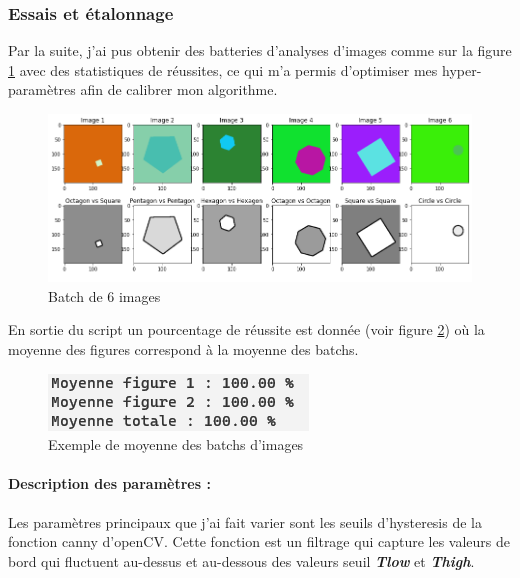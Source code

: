 	
	\subsubsection{Essais et étalonnage}
	Par la suite, j'ai pus obtenir des batteries d'analyses d'images comme sur la figure \ref{fig:batchexemple} avec des statistiques de réussites, ce qui m'a permis d'optimiser mes hyper-paramètres afin de calibrer mon algorithme.
	\begin{figure}[h]
		\centering
		\includegraphics[width=\textwidth]{Figures/BatchExemple}
		\caption{Batch de 6 images}
		\label{fig:batchexemple}
	\end{figure}
	
	En sortie du script un pourcentage de réussite est donnée (voir figure \ref{fig:moyennebatchs}) où la moyenne des figures correspond à la moyenne des batchs.
	
	\begin{figure}[h]
		\centering
		\includegraphics[width=0.5\linewidth]{Figures/MoyenneBatchs}
		\caption{Exemple de moyenne des batchs d'images}
		\label{fig:moyennebatchs}
	\end{figure}
	
	
	\paragraph{Description des paramètres : } Les paramètres principaux que j'ai fait varier sont les seuils d'hysteresis de la fonction canny d'openCV. Cette fonction est un filtrage qui capture les valeurs de bord qui fluctuent au-dessus et au-dessous des valeurs seuil \textbf{\textit{Tlow}} et \textbf{\textit{Thigh}}.
	

